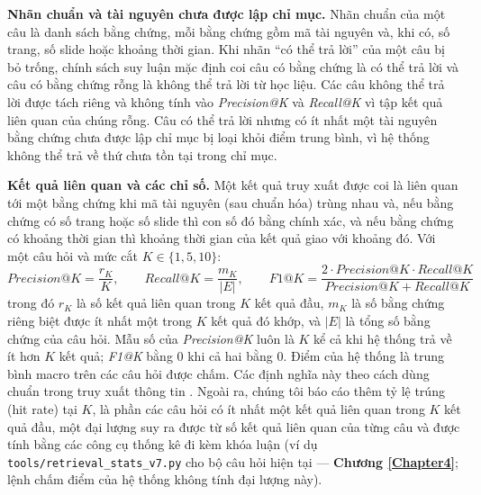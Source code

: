 \bigbreak\noindent
\textbf{Nhãn chuẩn và tài nguyên chưa được lập chỉ mục.} Nhãn chuẩn của một câu là danh sách bằng chứng, mỗi bằng chứng gồm mã tài nguyên và, khi có, số trang, số slide hoặc khoảng thời gian. Khi nhãn ``có thể trả lời'' của một câu bị bỏ trống, chính sách suy luận mặc định coi câu có bằng chứng là có thể trả lời và câu có bằng chứng rỗng là không thể trả lời từ học liệu. Các câu không thể trả lời được tách riêng và không tính vào \textit{Precision@K} và \textit{Recall@K} vì tập kết quả liên quan của chúng rỗng. Câu có thể trả lời nhưng có ít nhất một tài nguyên bằng chứng chưa được lập chỉ mục bị loại khỏi điểm trung bình, vì hệ thống không thể trả về thứ chưa tồn tại trong chỉ mục.

\bigbreak\noindent
\textbf{Kết quả liên quan và các chỉ số.} Một kết quả truy xuất được coi là liên quan tới một bằng chứng khi mã tài nguyên (sau chuẩn hóa) trùng nhau và, nếu bằng chứng có số trang hoặc số slide thì con số đó bằng chính xác, và nếu bằng chứng có khoảng thời gian thì khoảng thời gian của kết quả giao với khoảng đó. Với một câu hỏi và mức cắt $K\in\{1,5,10\}$:
\begin{equation}\label{eq:pk}
    \mathit{Precision@K} = \frac{r_K}{K}, \qquad
    \mathit{Recall@K} = \frac{m_K}{|E|}, \qquad
    \mathit{F1@K} = \frac{2\cdot \mathit{Precision@K}\cdot \mathit{Recall@K}}{\mathit{Precision@K}+\mathit{Recall@K}}
\end{equation}
trong đó $r_K$ là số kết quả liên quan trong $K$ kết quả đầu, $m_K$ là số bằng chứng riêng biệt được ít nhất một trong $K$ kết quả đó khớp, và $|E|$ là tổng số bằng chứng của câu hỏi. Mẫu số của \textit{Precision@K} luôn là $K$ kể cả khi hệ thống trả về ít hơn $K$ kết quả; \textit{F1@K} bằng 0 khi cả hai bằng 0. Điểm của hệ thống là trung bình macro trên các câu hỏi được chấm. Các định nghĩa này theo cách dùng chuẩn trong truy xuất thông tin \cite{manning2008ir}. Ngoài ra, chúng tôi báo cáo thêm tỷ lệ trúng (hit rate) tại $K$, là phần các câu hỏi có ít nhất một kết quả liên quan trong $K$ kết quả đầu, một đại lượng suy ra được từ số kết quả liên quan của từng câu và được tính bằng các công cụ thống kê đi kèm khóa luận (ví dụ \texttt{tools/retrieval\_stats\_v7.py} cho bộ câu hỏi hiện tại — \textbf{Chương \ref{Chapter4}}; lệnh chấm điểm của hệ thống không tính đại lượng này).



